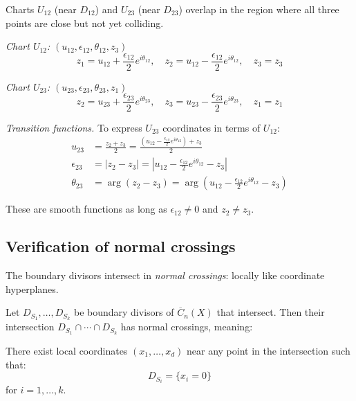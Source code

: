 \begin{example}\label{ex:transition-d12-d23}
Charts $U_{12}$ (near $D_{12}$) and $U_{23}$ (near $D_{23}$) overlap in the region where
all three points are close but not yet colliding.

\emph{Chart $U_{12}$:} $(u_{12}, \epsilon_{12}, \theta_{12}, z_3)$
\[z_1 = u_{12} + \frac{\epsilon_{12}}{2} e^{i\theta_{12}}, \quad
z_2 = u_{12} - \frac{\epsilon_{12}}{2} e^{i\theta_{12}}, \quad z_3 = z_3\]

\emph{Chart $U_{23}$:} $(u_{23}, \epsilon_{23}, \theta_{23}, z_1)$
\[z_2 = u_{23} + \frac{\epsilon_{23}}{2} e^{i\theta_{23}}, \quad
z_3 = u_{23} - \frac{\epsilon_{23}}{2} e^{i\theta_{23}}, \quad z_1 = z_1\]

\emph{Transition functions.}
To express $U_{23}$ coordinates in terms of $U_{12}$:
\begin{align}
u_{23} &= \frac{z_2 + z_3}{2} = \frac{(u_{12} - \frac{\epsilon_{12}}{2}e^{i\theta_{12}}) + z_3}{2}\\
\epsilon_{23} &= |z_2 - z_3| = \left| u_{12} - \frac{\epsilon_{12}}{2}e^{i\theta_{12}} - z_3 \right|\\
\theta_{23} &= \arg(z_2 - z_3) = \arg\left(u_{12} - \frac{\epsilon_{12}}{2}e^{i\theta_{12}} - z_3\right)
\end{align}

These are smooth functions as long as $\epsilon_{12} \neq 0$ and $z_2 \neq z_3$.
\end{example}

\subsection{Verification of normal crossings}

The boundary divisors intersect in \emph{normal crossings}: locally
like coordinate hyperplanes.

\begin{theorem}\label{thm:normal-crossings-verified}
Let $D_{S_1}, \ldots, D_{S_k}$ be boundary divisors of $\overline{C}_n(X)$ that intersect.
Then their intersection $D_{S_1} \cap \cdots \cap D_{S_k}$ has normal crossings, meaning:

There exist local coordinates $(x_1, \ldots, x_d)$ near any point in the intersection such that:
\[D_{S_i} = \{x_i = 0\}\]
for $i = 1, \ldots, k$.
\end{theorem}

